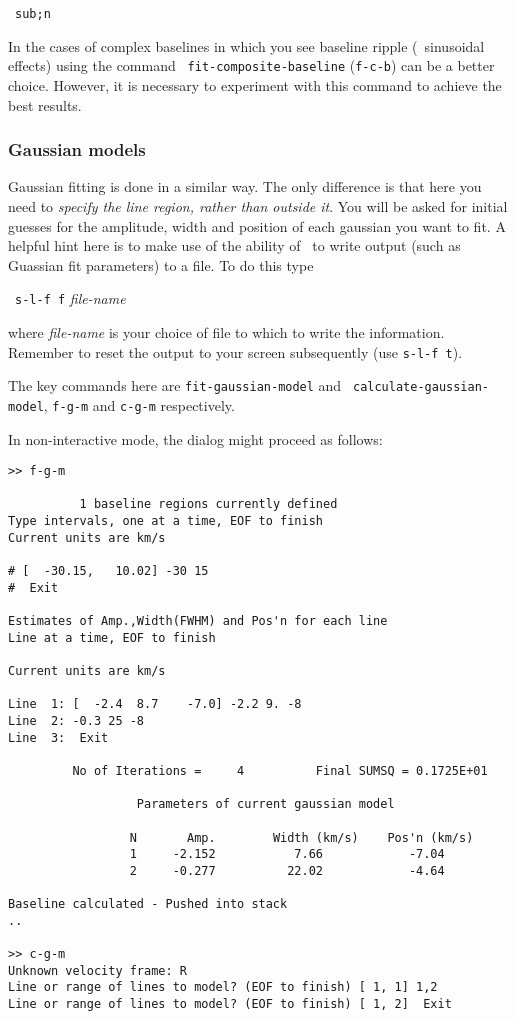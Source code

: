 \SP\ \verb|sub;n|

In the cases of complex baselines in which you see baseline ripple
(\ie\ sinusoidal effects) using the command {\tt
fit-composite-baseline} ({\tt{f-c-b}}) can be a better choice. However,
it is necessary to experiment with this command to achieve the best
results.

\subsubsection{Gaussian models}
Gaussian fitting is done in a similar way.  The only difference is
that here you need to {\it specify the line region, rather than outside
it}. You will be asked for initial guesses for the amplitude, width and
position of each gaussian you want to fit. A helpful hint here is to
make use of the ability of \SPECX\ to write output (such as Guassian
fit parameters) to a file. To do this type

\SP\ \verb|s-l-f f| {\it file-name}

where {\it file-name} is your choice of file to which to write the
information.  Remember to reset the output to your screen subsequently
(use {\tt s-l-f t}).

The key commands here are {\tt fit-gaussian-model} and {\tt 
calculate-gaussian-model}, {\tt f-g-m} and {\tt c-g-m} respectively.

In non-interactive mode, the dialog might proceed as follows:
\begin{verbatim}
>> f-g-m

          1 baseline regions currently defined
Type intervals, one at a time, EOF to finish
Current units are km/s

# [  -30.15,   10.02] -30 15
#  Exit

Estimates of Amp.,Width(FWHM) and Pos'n for each line
Line at a time, EOF to finish

Current units are km/s

Line  1: [  -2.4  8.7    -7.0] -2.2 9. -8
Line  2: -0.3 25 -8
Line  3:  Exit

         No of Iterations =     4          Final SUMSQ = 0.1725E+01

                  Parameters of current gaussian model

                 N       Amp.        Width (km/s)    Pos'n (km/s)
                 1     -2.152           7.66            -7.04
                 2     -0.277          22.02            -4.64

Baseline calculated - Pushed into stack
..

>> c-g-m
Unknown velocity frame: R
Line or range of lines to model? (EOF to finish) [ 1, 1] 1,2
Line or range of lines to model? (EOF to finish) [ 1, 2]  Exit
\end{verbatim}

